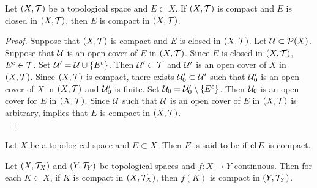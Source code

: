 \documentclass{book}
\begin{document}
	\begin{ex} 
		Let $(X, \mathcal{T})$ be a topological space and $E \subset X$. If $(X, \mathcal{T})$ is compact and $E$ is closed in $(X, \mathcal{T})$, then $E$ is compact in $(X, \mathcal{T})$.
	\end{ex}

	\begin{proof}
		Suppose that $(X, \mathcal{T})$ is compact and $E$ is closed in $(X, \mathcal{T})$. Let $\mathcal{U} \subset \mathcal{P}(X)$. Suppose that $\mathcal{U}$ is an open cover of $E$ in $(X, \mathcal{T})$. Since $E$ is closed in $(X, \mathcal{T})$, $E^c \in \mathcal{T}$. Set $\mathcal{U}' = \mathcal{U} \cup \{E^c\}$. Then $\mathcal{U}' \subset \mathcal{T}$ and $\mathcal{U}'$ is an open cover of $X$ in $(X, \mathcal{T})$.  Since $(X, \mathcal{T})$ is compact, there exists $\mathcal{U}'_0 \subset \mathcal{U}'$ such that $\mathcal{U}'_0$ is an open cover of $X$ in $(X, \mathcal{T})$ and $\mathcal{U}'_0$ is finite. Set $\mathcal{U}_0 = \mathcal{U}'_0 \setminus \{E^c\}$. Then $\mathcal{U}_0$ is an open cover for $E$ in $(X, \mathcal{T})$. Since $\mathcal{U}$ such that $\mathcal{U}$ is an open cover of $E$ in $(X, \mathcal{T})$ is arbitrary,  implies that $E$ is compact in $(X, \mathcal{T})$.
		\\
	\end{proof}
	
	
	
	
	\begin{defn} 
		Let $X$ be a topological space and $E \subset X$. Then $E$ is said to be  if $\operatorname{cl} E$ is compact.
	\end{defn}

	\begin{ex} 
		Let $(X, \mathcal{T}_X)$ and $(Y, \mathcal{T}_Y)$ be topological spaces and $f:X \rightarrow Y$ continuous. Then for each $K \subset X$, if $K$ is compact in $(X, \mathcal{T}_X)$, then $f(K)$ is compact in $(Y, \mathcal{T}_Y)$.
	\end{ex}
\end{document}
